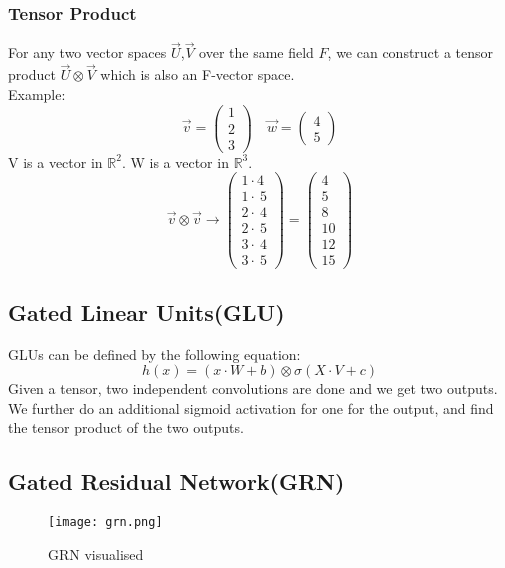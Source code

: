 \documentclass{article}
\begin{document}
\subsubsection{Tensor Product}
For any two vector spaces $\vec{U}$,$\vec{V}$ over the same field $F$, we can construct a tensor product $\vec{U}\otimes\vec{V}$ which is also an F-vector space.\\
Example:
$$\vec{v}=\begin{pmatrix}1\\ 2\\ 3\end{pmatrix}\quad \vec{w}=\begin{pmatrix}4\\ 5\end{pmatrix}$$
V is a vector in $\mathbb{R}^{2}$. W is a vector in $\mathbb{R}^{3}$.
$$\vec{v}\otimes\vec{v} \rightarrow \begin{pmatrix}1\cdot 4\\ 1\cdot \:5\\ 2\cdot \:4\\ 2\cdot \:5\\ 3\cdot \:4\\ 3\cdot \:5\end{pmatrix}=\begin{pmatrix}4\\ 5\\ 8\\ 10\\ 12\\ 15\end{pmatrix}$$

\subsection{Gated Linear Units(GLU)}
GLUs can be defined by the following equation:
$$h(x)=(x\cdot W +b)\otimes \sigma(X\cdot V+c)$$
Given a tensor, two independent convolutions are done and we get two outputs. We further do an additional sigmoid activation for one for the output, and find the tensor product of the two outputs.


\subsection{Gated Residual Network(GRN)}
\begin{figure}[h]
    \centering
    \texttt{[image: grn.png]}
    \caption{GRN visualised}
\end{figure}
\end{document}
